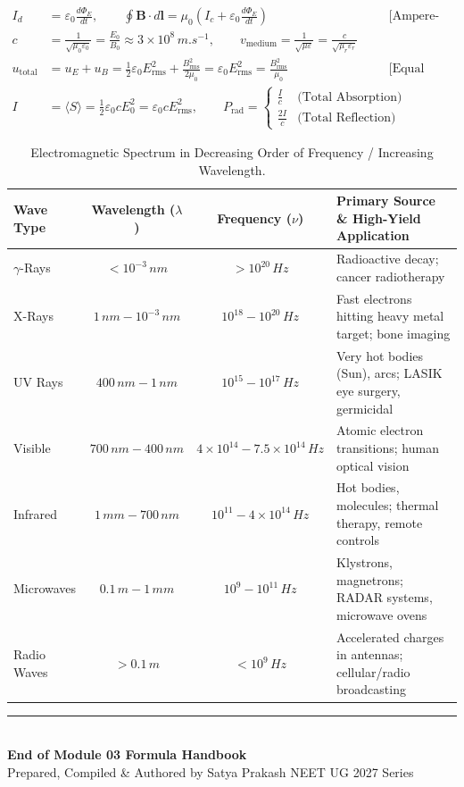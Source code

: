 \documentclass[11pt,a4paper]{article}
\begin{document}
\begin{formulabox}
\begin{align}
  I_d &= \varepsilon_0 \frac{d\Phi_E}{dt}, \qquad \oint \mathbf{B}\cdot d\mathbf{l} = \mu_0\left(I_c + \varepsilon_0\frac{d\Phi_E}{dt}\right) && \text{[Ampere-Maxwell Law]} \\
  c &= \frac{1}{\sqrt{\mu_0\varepsilon_0}} = \frac{E_0}{B_0} \approx 3\times 10^8\,\si{m.s^{-1}}, \qquad v_{\text{medium}} = \frac{1}{\sqrt{\mu\varepsilon}} = \frac{c}{\sqrt{\mu_r \varepsilon_r}} \\
  u_{\text{total}} &= u_E + u_B = \frac{1}{2}\varepsilon_0 E_{\text{rms}}^2 + \frac{B_{\text{rms}}^2}{2\mu_0} = \varepsilon_0 E_{\text{rms}}^2 = \frac{B_{\text{rms}}^2}{\mu_0} && \text{[Equal Electric \& Magnetic Energy]} \\
  I &= \langle S \rangle = \frac{1}{2}\varepsilon_0 c E_0^2 = \varepsilon_0 c E_{\text{rms}}^2, \qquad P_{\text{rad}} = \begin{cases} \frac{I}{c} & \text{(Total Absorption)} \\ \frac{2I}{c} & \text{(Total Reflection)} \end{cases}
\end{align}
\end{formulabox}

\begin{table}[htbp]
\centering
\small
\renewcommand{\arraystretch}{1.2}
\begin{tabularx}{\textwidth}{L c c L}
\toprule
\textbf{Wave Type} & \textbf{Wavelength ($\lambda$)} & \textbf{Frequency ($\nu$)} & \textbf{Primary Source \& High-Yield Application} \\
\midrule
$\gamma$-Rays & $< 10^{-3}\,\si{nm}$ & $> 10^{20}\,\si{Hz}$ & Radioactive decay; cancer radiotherapy \\
X-Rays & $1\,\si{nm} - 10^{-3}\,\si{nm}$ & $10^{18} - 10^{20}\,\si{Hz}$ & Fast electrons hitting heavy metal target; bone imaging \\
UV Rays & $400\,\si{nm} - 1\,\si{nm}$ & $10^{15} - 10^{17}\,\si{Hz}$ & Very hot bodies (Sun), arcs; LASIK eye surgery, germicidal \\
Visible & $700\,\si{nm} - 400\,\si{nm}$ & $4\times 10^{14} - 7.5\times 10^{14}\,\si{Hz}$ & Atomic electron transitions; human optical vision \\
Infrared & $1\,\si{mm} - 700\,\si{nm}$ & $10^{11} - 4\times 10^{14}\,\si{Hz}$ & Hot bodies, molecules; thermal therapy, remote controls \\
Microwaves & $0.1\,\si{m} - 1\,\si{mm}$ & $10^9 - 10^{11}\,\si{Hz}$ & Klystrons, magnetrons; RADAR systems, microwave ovens \\
Radio Waves & $> 0.1\,\si{m}$ & $< 10^9\,\si{Hz}$ & Accelerated charges in antennas; cellular/radio broadcasting \\
\bottomrule
\end{tabularx}
\caption{Electromagnetic Spectrum in Decreasing Order of Frequency / Increasing Wavelength.}
\end{table}

\vspace{15pt}
\begin{center}
  \rule{0.6\textwidth}{0.8pt}\\[6pt]
  {\small\textbf{\color{primarydark}End of Module 03 Formula Handbook}}\\[2pt]
  {\footnotesize\color{accentblue}Prepared, Compiled \& Authored by Satya Prakash \quad\textbar\quad NEET UG 2027 Series}
\end{center}
\end{document}
